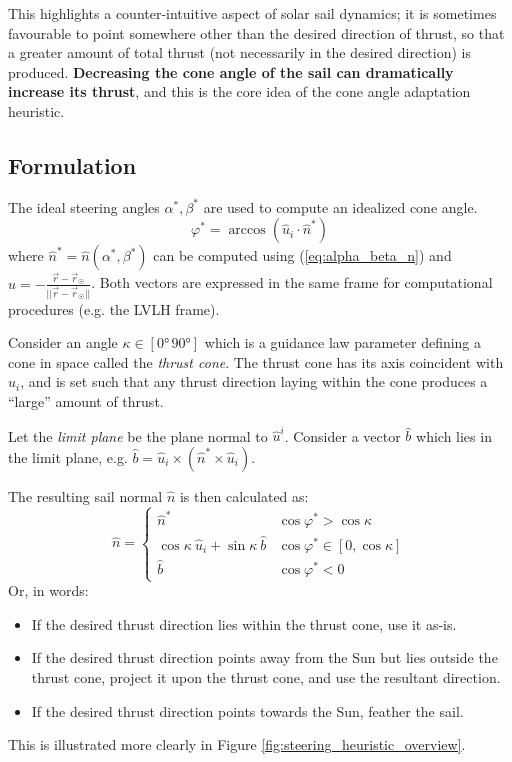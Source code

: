 This highlights a counter-intuitive aspect of solar sail dynamics; it is sometimes favourable to point somewhere other than the desired direction of thrust, so that a greater amount of total thrust (not necessarily in the desired direction) is produced. \textbf{Decreasing the cone angle of the sail can dramatically increase its thrust}, and this is the core idea of the cone angle adaptation heuristic.

\subsection{Formulation}
The ideal steering angles \(\alpha^*, \beta^*\) are used to compute an idealized cone angle.
\begin{equation}
    \varphi^* = \arccos(\hat{u}_i \cdot \hat{n}^*)
    \label{eq:cone_star}
\end{equation}
where \(\hat{n}^* = \hat{n}(\alpha^*, \beta^*)\) can be computed using (\ref{eq:alpha_beta_n}) and \(\hat{u} = -\frac{\vec{r} - \vec{r}_{\astrosun}}{||\vec{r} - \vec{r}_{\astrosun}||}\). Both vectors are expressed in the same frame for computational procedures (e.g. the LVLH frame).

Consider an angle \(\kappa \in [\ang{0}\, \ang{90}]\) which is a guidance law parameter defining a cone in space called the \textit{thrust cone}. The thrust cone has its axis coincident with \(\hat{u}_i\), and is set such that any thrust direction laying within the cone produces a ``large'' amount of thrust.

Let the \textit{limit plane} be the plane normal to \(\hat{u}^i\). Consider a vector \(\hat{b}\) which lies in the limit plane, e.g. \(\hat{b} = \hat{u}_i \times (\hat{n}^* \times \hat{u}_i)\).

The resulting sail normal \(\hat{n}\) is then calculated as:
\begin{equation}
    \hat{n} = \begin{cases}
        \hat{n}^*                                       & \cos \varphi^* > \cos \kappa          \\
        \cos \kappa \ \hat{u}_i + \sin \kappa \ \hat{b} & \cos \varphi^* \in  [ 0, \cos \kappa] \\
        \hat{b}                                         & \cos \varphi^* < 0
    \end{cases}
    \label{eq:ndf_law}
\end{equation}
Or, in words:
\begin{itemize}
    \item If the desired thrust direction lies within the thrust cone, use it as-is.
    \item If the desired thrust direction points away from the Sun but lies outside the thrust cone, project it upon the thrust cone, and use the resultant direction.
    \item If the desired thrust direction points towards the Sun, feather the sail.
\end{itemize}
This is illustrated more clearly in Figure \ref{fig:steering_heuristic_overview}.

